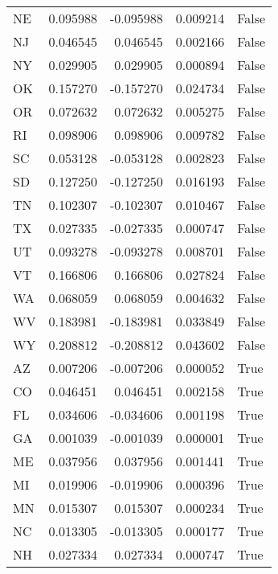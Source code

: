 \begin{table}
\begin{tabular}{lrrrl}
      NE &   0.095988 & -0.095988 &       0.009214 &         False \\
      NJ &   0.046545 &  0.046545 &       0.002166 &         False \\
      NY &   0.029905 &  0.029905 &       0.000894 &         False \\
      OK &   0.157270 & -0.157270 &       0.024734 &         False \\
      OR &   0.072632 &  0.072632 &       0.005275 &         False \\
      RI &   0.098906 &  0.098906 &       0.009782 &         False \\
      SC &   0.053128 & -0.053128 &       0.002823 &         False \\
      SD &   0.127250 & -0.127250 &       0.016193 &         False \\
      TN &   0.102307 & -0.102307 &       0.010467 &         False \\
      TX &   0.027335 & -0.027335 &       0.000747 &         False \\
      UT &   0.093278 & -0.093278 &       0.008701 &         False \\
      VT &   0.166806 &  0.166806 &       0.027824 &         False \\
      WA &   0.068059 &  0.068059 &       0.004632 &         False \\
      WV &   0.183981 & -0.183981 &       0.033849 &         False \\
      WY &   0.208812 & -0.208812 &       0.043602 &         False \\
      AZ &   0.007206 & -0.007206 &       0.000052 &          True \\
      CO &   0.046451 &  0.046451 &       0.002158 &          True \\
      FL &   0.034606 & -0.034606 &       0.001198 &          True \\
      GA &   0.001039 & -0.001039 &       0.000001 &          True \\
      ME &   0.037956 &  0.037956 &       0.001441 &          True \\
      MI &   0.019906 & -0.019906 &       0.000396 &          True \\
      MN &   0.015307 &  0.015307 &       0.000234 &          True \\
      NC &   0.013305 & -0.013305 &       0.000177 &          True \\
      NH &   0.027334 &  0.027334 &       0.000747 &          True \\

\end{tabular}
\end{table}
